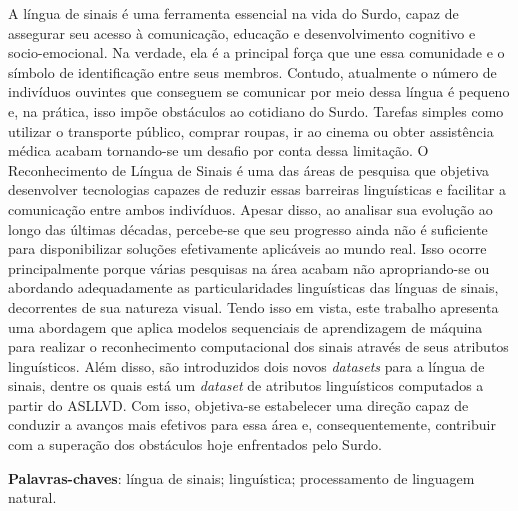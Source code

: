 \begin{resumo}[Resumo]
  \noindent
  A língua de sinais é uma ferramenta essencial na vida do Surdo, capaz de assegurar seu acesso à comunicação, educação e desenvolvimento cognitivo e socio-emocional.
  Na verdade, ela é a principal força que une essa comunidade e o símbolo de identificação entre seus membros.
  Contudo, atualmente o número de indivíduos ouvintes que conseguem se comunicar por meio dessa língua é pequeno e, na prática, isso impõe obstáculos ao cotidiano do Surdo.
  Tarefas simples como utilizar o transporte público, comprar roupas, ir ao cinema ou obter assistência médica acabam tornando-se um desafio por conta dessa limitação.
  O Reconhecimento de Língua de Sinais é uma das áreas de pesquisa que objetiva desenvolver tecnologias capazes de reduzir essas barreiras linguísticas e facilitar a comunicação entre ambos indivíduos.
  Apesar disso, ao analisar sua evolução ao longo das últimas décadas, percebe-se que seu progresso ainda não é suficiente para disponibilizar soluções efetivamente aplicáveis ao mundo real.
  Isso ocorre principalmente porque várias pesquisas na área acabam não apropriando-se ou abordando adequadamente as particularidades linguísticas das línguas de sinais, decorrentes de sua natureza visual.
  Tendo isso em vista, este trabalho apresenta uma abordagem que aplica modelos sequenciais de aprendizagem de máquina para realizar o reconhecimento computacional dos sinais através de seus atributos linguísticos. Além disso, são introduzidos dois novos \textit{datasets} para a língua de sinais, dentre os quais está um \textit{dataset} de atributos linguísticos computados a partir do ASLLVD.
  Com isso, objetiva-se estabelecer uma direção capaz de conduzir a avanços mais efetivos para essa área e, consequentemente, contribuir com a superação dos obstáculos hoje enfrentados pelo Surdo.

  \vspace{\onelineskip}

  \noindent
  \textbf{Palavras-chaves}: língua de sinais; linguística; processamento de linguagem natural.
\end{resumo}



